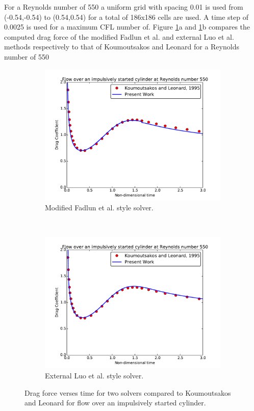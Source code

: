 For a Reynolds number of 550 a uniform grid with spacing 0.01 is used from (-0.54,-0.54) to (0.54,0.54) for a total of 186x186 cells are used.
A time step of 0.0025 is used for a maximum CFL number of.
Figure \ref{fig:cy550}a and \ref{fig:cy550}b compares the computed drag force of the modified Fadlun et al. and external Luo et al. methods respectively to that of Koumoutsakos and Leonard for a Reynolds number of 550
\begin{figure}[!htb]
	\centering
	\begin{subfigure}{0.4\textwidth}
		\includegraphics[width=\linewidth]{cy550fadlun}
		\caption{Modified Fadlun et al. style solver.}
	\end{subfigure}
	~
	\begin{subfigure}{0.4\textwidth}
		\includegraphics[width=\linewidth]{cy550luo}
		\caption{External Luo et al. style solver.}
	\end{subfigure}
	\caption{Drag force verses time for two solvers compared to Koumoutsakos and Leonard for flow over an impulsively started cylinder.}
	\label{fig:cy550}
\end{figure}

